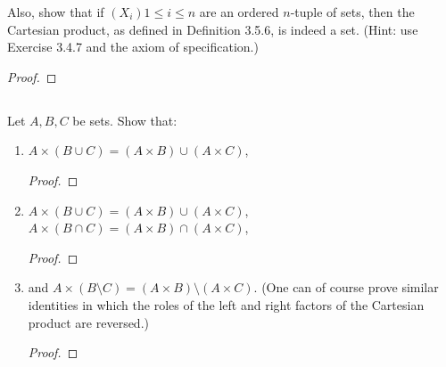 \documentclass[../../main.tex]{subfiles}
\begin{document}
\begin{q}
    Also, show that if $(X_i){1 \leq i \leq n}$ are an ordered $n$-tuple of sets, then the Cartesian product, as defined in Definition 3.5.6, is indeed a set. (Hint: use Exercise 3.4.7 and the axiom of specification.)
\end{q}

\begin{proof}
    
\end{proof}
\begin{xx}
    
\end{xx}

\addtocounter{subsection}{1}
\subsection{}
\begin{q}
    Let $A, B, C$ be sets. Show that: 
    \begin{enumerate}
        \item $A \times (B \cup C) = (A \times B) \cup (A \times C)$,
        \begin{proof}
    
        \end{proof}
        \begin{xx}
            
        \end{xx}        
        \item $A \times (B \cup C) = (A \times B) \cup (A \times C)$, $A \times (B \cap C) = (A \times B) \cap (A \times C)$,
        \begin{proof}
    
        \end{proof}
        \begin{xx}
            
        \end{xx}        
        \item  and $A \times (B\setminus C) = (A \times B)\setminus(A \times C)$. (One can of course prove similar identities in which the roles of the left and right factors of the Cartesian product are reversed.)
        \begin{proof}
    
        \end{proof}
        \begin{xx}
            
        \end{xx}        
    \end{enumerate}    
\end{q}
\end{document}
